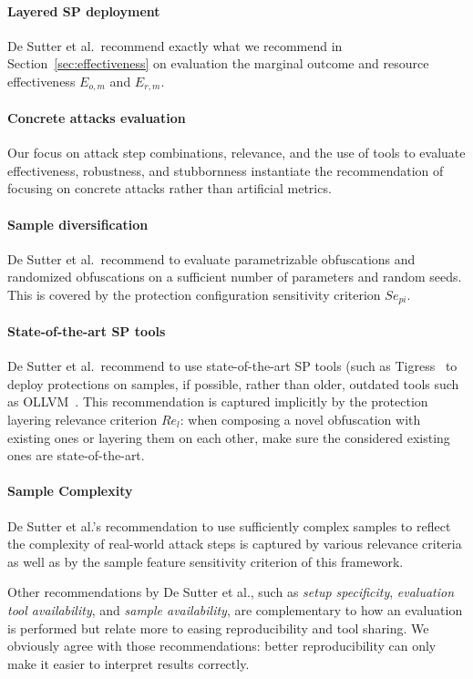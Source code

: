 \paragraph{Layered SP deployment} De Sutter et al.\ recommend exactly what we recommend in Section~\ref{sec:effectiveness} on evaluation the marginal outcome and resource effectiveness $E_{o,m}$ and $E_{r,m}$. 
\paragraph{Concrete attacks evaluation} Our focus on attack step combinations, relevance, and the use of tools to evaluate effectiveness, robustness, and stubbornness instantiate the recommendation of focusing on concrete attacks rather than artificial metrics. 
\paragraph{Sample diversification} De Sutter et al.\ recommend to evaluate parametrizable obfuscations and randomized obfuscations on a sufficient number of parameters and random seeds. This is covered by the protection configuration sensitivity criterion $Se_{pi}$.
\paragraph{State-of-the-art SP tools} De Sutter et al.\ recommend to use state-of-the-art SP tools (such as Tigress~\cite{tigress2023} to deploy protections on samples, if possible, rather than older, outdated tools such as OLLVM~\cite{ollvm}. This recommendation is captured implicitly by the protection layering relevance criterion $Re_l$: when composing a novel obfuscation with existing ones or layering them on each other, make sure the considered existing ones are state-of-the-art. 
\paragraph{Sample Complexity} De Sutter et al.'s recommendation to use sufficiently complex samples to reflect the complexity of real-world attack steps is captured by various relevance criteria as well as by the sample feature sensitivity criterion of this framework.   

\vspace{0.2cm}

Other recommendations by De Sutter et al., such as \emph{setup specificity}, \emph{evaluation tool availability}, and \emph{sample availability}, are complementary to how an evaluation is performed but relate more to easing reproducibility and tool sharing. We obviously agree with those recommendations: better reproducibility can only make it easier to interpret results correctly. 
